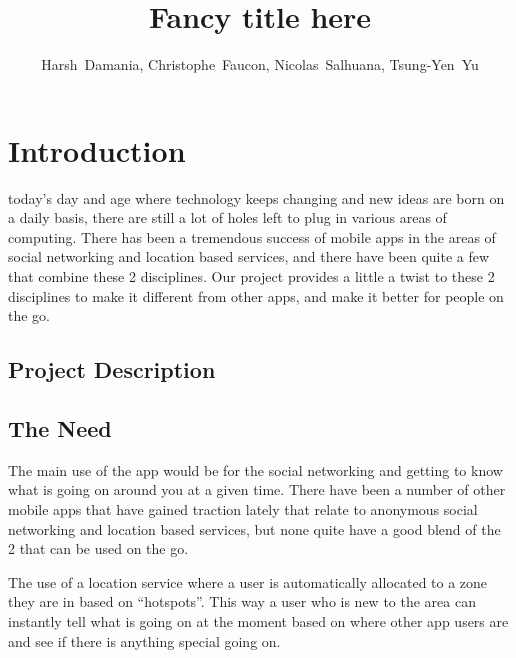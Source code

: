\documentclass[11pt, journal]{IEEEtran}
\begin{document}
\title{Fancy title here}

\author{Harsh~Damania, Christophe~Faucon, Nicolas~Salhuana, Tsung-Yen~Yu}


\maketitle
\IEEEdisplaynotcompsoctitleabstractindextext

\section{Introduction}
	 today's day and age where technology keeps changing and new ideas are born on a daily basis, there are still a lot of holes left to plug in various areas of computing. There has been a tremendous success of mobile apps in the areas of social networking and location based services, and there have been quite a few that combine these 2 disciplines. Our project provides a little a twist to these 2 disciplines to make it different from other apps, and make it better for people on the go.

	\subsection{Project Description}
	
	\subsection{The Need}

		The main use of the app would be for the social networking and getting to know what is going on around you at a given time. There have been a number of other mobile apps that have gained traction lately that relate to anonymous social networking and location based services, but none quite have a good blend of the 2 that can be used on the go.

		The use of a location service where a user is automatically allocated to a zone they are in based on ``hotspots''. This way a user who is new to the area can instantly tell what is going on at the moment based on where other app users are and see if there is anything special going on.
\end{document}
